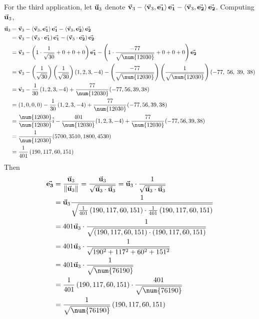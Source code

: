     \nl For the third application, let $\vec{\mathbf{u}}_3$ denote $\vec{\mathbf{v}}_3 - \left\langle{\vec{\mathbf{v}}_3, \vec{\mathbf{e_{1}}}}\right\rangle\vec{\mathbf{e_{1}}} - \left\langle{\vec{\mathbf{v}}_3, \vec{\mathbf{e_{2}}}}\right\rangle \vec{\mathbf{e_{2}}}$. Computing $\vec{\mathbf{u}}_3$,
    \begin{align*}
        \bu_3 &= \bv_3 - \inner{\bv_3, \ev1}\ev1 - \inner{\bv_3, \ev2} \ev2\\
        &= \bv_3 - \pars{\bv_3 \cdot \ev1}\ev1 - \pars{\bv_3\cdot \ev2} \ev2\\
        &= \bv_3 - \pars{1\cdot \over{\sqrt{30}} + 0 + 0 + 0}\ev1 - \pars{1 \cdot \frac{-77}{\sqrt{\num{12030}}}+0+0+0} \ev2\\
        &= \bv_3 - \pover{\sqrt{30}}\pover{\sqrt{30}}(1,2,3,-4) - \pfrac{-77}{\sqrt{\num{12030}}}\pover{\sqrt{\num{12030}}}\pars{-77,\; 56,\; 39,\; 38}\\
        &= \bv_3 - \over{30}\pars{1,2,3,-4} + \frac{77}{\num{12030}}(-77,56,39,38)\\
        &= (1,0,0,0) - \over{30}\pars{1,2,3,-4} + \frac{77}{\num{12030}}(-77,56,39,38)\\
        &= \frac{\num{12030}}{\num{12030}} \hat{i} - \frac{401}{\num{12030}}(1,2,3,-4) + \frac{77}{\num{12030}}(-77,56,39,38)\\
        &= \over{\num{12030}}(5700, 3510, 1800, 4530)\\
        &= \over{401}\pars{190, 117, 60, 151}
    \end{align*}
    Then
    \begin{align*}
        \ev3 &= \frac{\bu_3}{\norm{\bu_3}} = \frac{\bu_3}{\sqrt{\bu_3 \cdot \bu_3}} = \bu_3 \cdot \over{\sqrt{\bu_3 \cdot \bu_3}}
        \\ &= \bu_3 \over{\sqrt{ \over{401}\pars{190, 117, 60, 151} \cdot \over{401}\pars{190, 117, 60, 151} }}\\
        &= 401\bu_3 \cdot \over{\sqrt{\pars{190, 117, 60, 151}\cdot \pars{190, 117, 60, 151}}} \\
        &= 401\bu_3 \cdot \over{\sqrt{190^2 + 117^2 + 60^2 + 151^2}} \\
        &= 401\bu_3 \cdot \over{\sqrt{\num{76190}}} \\
        &= \over{401}\pars{190, 117, 60, 151} \cdot \frac{401}{\sqrt{\num{76190}}}
        \\ &= \over{\sqrt{\num{76190}}}\pars{190, 117, 60, 151}
    \end{align*}

